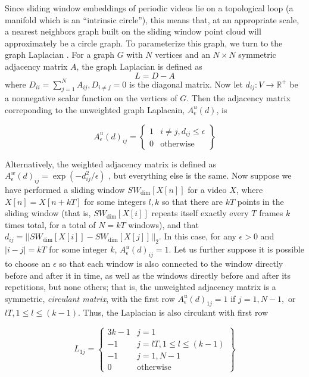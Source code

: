 \documentclass{article}
\begin{document}
Since sliding window embeddings of periodic videos lie on a topological loop (a manifold which is an ``intrinsic circle''), this means that, at an appropriate scale, a nearest neighbors graph built on the sliding window point cloud will approximately be a circle graph.  To parameterize this graph, we turn to the graph Laplacian \cite{chung1997spectral}.  For a graph $G$ with $N$ vertices and an $N \times N$ symmetric adjacency matrix $A$, the graph Laplacian is defined as
\begin{equation}
L = D-A
\end{equation}
where $D_{ii} = \sum_{j = 1}^N A_{ij}, D_{i \neq j} = 0$ is the diagonal matrix.  Now let $d_{ij}: V \rightarrow \mathbb{R}^+$ be a nonnegative scalar function on the vertices of $G$.  Then the adjacency matrix correponding to the unweighted graph Laplacain, $A_{\epsilon}^u(d)$, is

\begin{equation}
A_{\epsilon}^u(d)_{ij} = \left\{ \begin{array}{cc} 1 & i \neq j, d_{ij} \leq \epsilon \\ 0 & \text{otherwise} \end{array} \right\}
\end{equation}

Alternatively, the weighted adjacency matrix is defined as $A_{\epsilon}^w(d)_{ij} = \exp(-d_{ij}^2/\epsilon)$ \cite{belkin2003laplacian}, but everything else is the same.  Now suppose we have performed a sliding window $SW_{\text{dim}}[X[n]]$ for a video $X$, where $X[n] = X[n+kT]$ for some integers $l, k$ so that there are $kT$ points in the sliding window (that is, $SW_{\text{dim}}[X[i]]$ repeats itself exactly every $T$ frames $k$ times total, for a total of $N = kT$ windows), and that $d_{ij} = ||SW_{\text{dim}}[X[i]] - SW_{\text{dim}}[X[j]]||_2$.  In this case, for any $\epsilon > 0$ and $|i - j| = kT$ for some integer $k$, $A^u_{\epsilon}(d)_{ij} = 1$.  Let us further suppose it is possible to choose an $\epsilon$ so that each window is also connected to the window directly before and after it in time, as well as the windows directly before and after its repetitions, but none others; that is, the unweighted adjacency matrix is a symmetric, {\em circulant matrix}, with the first row $A_{\epsilon}^u(d)_{1j} = 1$ if $j = 1, N-1,$ or $lT, 1 \leq l \leq (k-1)$.  Thus, the Laplacian is also circulant with first row

\begin{equation}
\label{eq:modellaplacian}
L_{1j} = \left\{ \begin{array}{cc} 3k-1 & j = 1 \\ -1 & j = lT, 1 \leq l \leq (k-1) \\ -1 & j = 1, N-1 \\ 0 & \text{otherwise} \end{array} \right\}
\end{equation}
\end{document}
